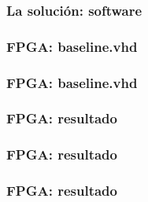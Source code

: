 \documentclass{beamer}
\begin{document}
\subsubsection{La solución: software}
\begin{frame}
  \frametitle{FPGA: baseline.vhd}
  \begin{block}{}
    \centering
  \end{block}
\end{frame}

\begin{frame}
  \frametitle{FPGA: baseline.vhd}
  \begin{block}{}
    \centering
  \end{block}
\end{frame}

\begin{frame}
  \frametitle{FPGA: resultado}
  \begin{block}{}
    \centering
  \end{block}
\end{frame}

\begin{frame}
  \frametitle{FPGA: resultado}
  \begin{block}{}
    \centering
  \end{block}
\end{frame}

\begin{frame}
  \frametitle{FPGA: resultado}
	\begin{columns}
	\begin{column}{0.50\textwidth}
  \begin{block}{}
    \begin{center}
    \end{center}
  \end{block}
	\end{column}
	\begin{column}{0.50\textwidth}
  \begin{block}{}
    \begin{center}
    \end{center}
  \end{block}
	\end{column}
  \end{columns}
\end{frame}
\end{document}
